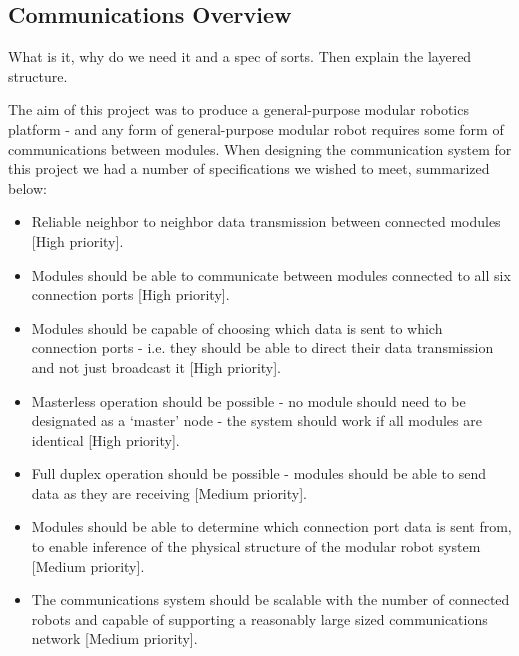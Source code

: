 \subsection{Communications Overview}

What is it, why do we need it and a spec of sorts. Then explain the layered structure.


The aim of this project was to produce a general-purpose modular robotics platform - and any form of general-purpose modular robot requires some form of communications between modules. When designing the communication system for this project we had a number of specifications we wished to meet, summarized below:

\begin{itemize}
\item Reliable neighbor to neighbor data transmission between connected modules [High priority].
\item Modules should be able to communicate between modules connected to all six connection ports [High priority].
\item Modules should be capable of choosing which data is sent to which connection ports - i.e. they should be able to direct their data transmission and not just broadcast it [High priority].
\item Masterless operation should be possible - no module should need to be designated as a `master' node -  the system should work if all modules are identical [High priority].
\item Full duplex operation should be possible - modules should be able to send data as they are receiving [Medium priority].
\item Modules should be able to determine which connection port data is sent from, to enable inference of the physical structure of the modular robot system [Medium priority].
\item The communications system should be scalable with the number of connected robots and capable of supporting a reasonably large sized communications network [Medium priority].
\end{itemize}



